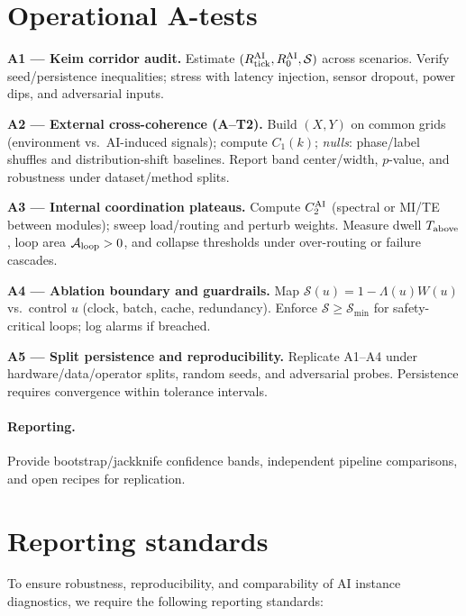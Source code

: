 \documentclass[12pt,a4paper,oneside]{scrreprt}
\begin{document}
\section{Operational A-tests}\label{sec:ai-tests}
\textbf{A1 — Keim corridor audit.} 
Estimate $(R_{\rm tick}^{\rm AI}, R_0^{\rm AI}, \mathcal S)$ across scenarios. 
Verify seed/persistence inequalities; stress with latency injection, sensor dropout, power dips, and adversarial inputs. 

\textbf{A2 — External cross-coherence (A--T2).} 
Build $(X,Y)$ on common grids (environment vs.\ AI-induced signals); compute $C_1(k)$; 
\emph{nulls}: phase/label shuffles and distribution-shift baselines. 
Report band center/width, $p$-value, and robustness under dataset/method splits. 

\textbf{A3 — Internal coordination plateaus.} 
Compute $C_2^{\rm AI}$ (spectral or MI/TE between modules); sweep load/routing and perturb weights. 
Measure dwell $T_{\rm above}$, loop area $\mathcal A_{\rm loop}>0$, and collapse thresholds under over-routing or failure cascades. 

\textbf{A4 — Ablation boundary and guardrails.} 
Map $\mathcal S(u)=1-\Lambda(u)W(u)$ vs.\ control $u$ (clock, batch, cache, redundancy). 
Enforce $\mathcal S\ge \mathcal S_{\min}$ for safety-critical loops; log alarms if breached. 

\textbf{A5 — Split persistence and reproducibility.} 
Replicate A1–A4 under hardware/data/operator splits, random seeds, and adversarial probes. 
Persistence requires convergence within tolerance intervals. 

\paragraph{Reporting.} 
Provide bootstrap/jackknife confidence bands, independent pipeline comparisons, and open recipes for replication.

\section{Reporting standards}\label{sec:ai-standards}
To ensure robustness, reproducibility, and comparability of AI instance diagnostics, we require the following reporting standards:
\end{document}
